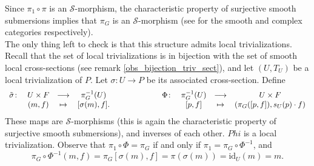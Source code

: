 \begin{center}
\end{center}
Since \(\pi_1 \circ \pi\) is an \(\mathcal{S}\)-morphism, the characteristic property of surjective smooth submersions implies that \(\pi_G\) is an \(\mathcal{S}\)-morphism (see \parencite[Th. 4.29]{lee_introSM} \parencite[Cor. 2.6]{lee_introCM} for the smooth and complex categories respectively). \\

The only thing left to check is that this structure admits local trivializations. Recall that the set of local trivializations is in bijection with the set of smooth local cross-sections (see remark \ref{obs_bijection_triv_sect}), and let \((U, T_U)\) be a local trivialization of \(P\). Let \(\sigma\colon U \to P\) be its associated cross-section. Define
\begin{equation} \label{trivialization_associated_bundle}
\begin{array}{cccc}
    \tilde{\sigma} \colon & U \times F & \longrightarrow & \pi^{-1}_G(U)\\
    & (m,f) & \mapsto & [\sigma(m), f].
\end{array}
\hspace{2 cm}
\begin{array}{cccc}
    \Phi\colon & \pi_G^{-1}(U) & \longrightarrow & U \times F \\
    & [p,f] & \mapsto & (\pi_G([p,f]), s_U(p)\cdot f)
\end{array}
\end{equation}
These maps are \(\mathcal{S}\)-morphisms (this is again the characteristic property of surjective smooth submersions), and inverses of each other. \(Phi\) is a local trivialization. Observe that \(\pi_1 \circ \Phi=\pi_G\) if and only if \(\pi_1=\pi_G \circ \Phi^{-1}\), and
\[
\pi_G \circ \Phi^{-1}(m,f)=\pi_G[\sigma(m), f]=\pi(\sigma(m))=\mathrm{id}_U(m)=m.
\]

